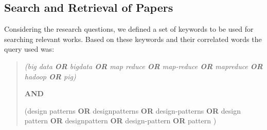 

\subsection{Search and Retrieval of Papers}

Considering the research questions, we defined a set of keywords to be used for
searching relevant works. Based on these keywords and their
correlated words the query used was:        
 
\begin{quote} \sl
\qquad  (big data \textbf{OR} bigdata \textbf{OR} map reduce \textbf{OR}
map-reduce \textbf{OR} mapreduce \textbf{OR} hadoop \textbf{OR} pig)

\textbf{AND}

\qquad (design patterns \textbf{OR} designpatterns \textbf{OR}
design-patterns \textbf{OR} design pattern
\textbf{OR} designpattern \textbf{OR} design-pattern \textbf{OR} pattern
)
\end{quote}